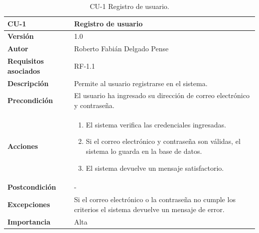 \begin{table}[p]
    \centering
    \begin{tabularx}{\linewidth}{ p{} X }
        \toprule
        \textbf{CU-1}    & \textbf{Registro de usuario}\\
        \toprule
        \textbf{Versión}              & 1.0    \\
        \textbf{Autor}                & Roberto Fabián Delgado Pense \\
        \textbf{Requisitos asociados} & RF-1.1 \\ 
        \textbf{Descripción}          & Permite al usuario registrarse en el sistema. \\
        \textbf{Precondición}         & El usuario ha ingresado su dirección de correo electrónico y contraseña. \\
        \textbf{Acciones}             &
        \begin{enumerate}
            \item El sistema verifica las credenciales ingresadas.
            \item Si el correo electrónico y contraseña son válidas, el sistema lo guarda en la base de datos.
            \item El sistema devuelve un mensaje satisfactorio.
        \end{enumerate}\\
        \textbf{Postcondición}        & - \\
        \textbf{Excepciones}          & Si el correo electrónico o la contraseña no cumple los criterios el sistema devuelve un mensaje de error. \\
        \textbf{Importancia}          & Alta \\
        \bottomrule
    \end{tabularx}
    \caption{CU-1 Registro de usuario.}
\end{table}

